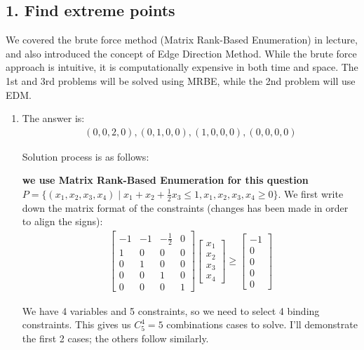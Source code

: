 \documentclass[12pt]{article}
\begin{document}
\subsection*{1. Find extreme points}
We covered the brute force method (Matrix Rank-Based Enumeration) in lecture, and also introduced the concept of Edge Direction Method. While the brute force approach is intuitive, it is computationally expensive in both time and space. The 1st and 3rd problems will be solved using MRBE, while the 2nd problem will use EDM.
\begin{enumerate}[label= (\alph*), leftmargin=2em]
\item The answer is:
\begin{align*}
(0, 0, 2, 0), (0, 1, 0, 0), (1, 0, 0, 0), (0, 0, 0, 0)
\end{align*} 

Solution process is as follows:

\textbf{we use Matrix Rank-Based Enumeration for this question} \\
$P = \{(x_1, x_2, x_3, x_4) \mid x_1 + x_2 + \frac{1}{2}x_3 \leq 1, x_1, x_2, x_3, x_4 \geq 0\}$.
We first write down the matrix format of the constraints (changes has been made in order to align the signs):
\begin{align*}
\begin{bmatrix}
-1 & -1 & -\frac{1}{2} & 0 \\
1 & 0 & 0 & 0 \\
0 & 1 & 0 & 0 \\
0 & 0 & 1 & 0 \\
0 & 0 & 0 & 1
\end{bmatrix}
\begin{bmatrix}
x_1 \\ x_2 \\ x_3 \\ x_4
\end{bmatrix} \geq 
\begin{bmatrix}
-1 \\ 0 \\ 0 \\ 0 \\ 0
\end{bmatrix}
\end{align*}

We have 4 variables and 5 constraints, so we need to select 4 binding constraints. This gives us $C_5^4 = 5$ combinations cases to solve. I'll demonstrate the first 2 cases; the others follow similarly.


\end{enumerate}
\end{document}

